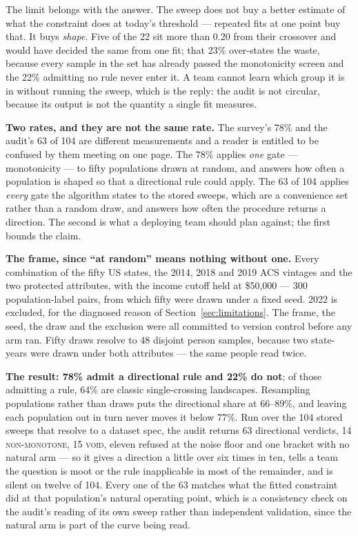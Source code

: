 \documentclass[conference]{IEEEtran}
\begin{document}
The limit belongs with the answer. The sweep does not buy a better estimate of what the
constraint does at today's threshold --- repeated fits at one point buy that. It buys
\emph{shape}. Five of the 22 sit more than 0.20 from their crossover and would have decided
the same from one fit; that 23\% over-states the waste, because every sample in the set has
already passed the monotonicity screen and the 22\% admitting no rule never enter it. A team
cannot learn which group it is in without running the sweep, which is the reply: the audit is
not circular, because its output is not the quantity a single fit measures.

\textbf{Two rates, and they are not the same rate.} The survey's 78\% and the audit's 63 of 104
are different measurements and a reader is entitled to be confused by them meeting on one
page. The 78\% applies \emph{one} gate --- monotonicity --- to fifty populations drawn at
random, and answers how often a population is shaped so that a directional rule could apply.
The 63 of 104 applies \emph{every} gate the algorithm states to the stored sweeps, which are a
convenience set rather than a random draw, and answers how often the procedure returns a
direction. The second is what a deploying team should plan against; the first bounds the
claim.

\textbf{The frame, since ``at random'' means nothing without one.} Every combination of the
fifty US states, the 2014, 2018 and 2019 ACS vintages and the two protected attributes, with
the income cutoff held at \$50{,}000 --- 300 population-label pairs, from which fifty were
drawn under a fixed seed. 2022 is excluded, for the diagnosed reason of
Section~\ref{sec:limitations}. The frame, the seed, the draw and the exclusion were all
committed to version control before any arm ran. Fifty draws resolve to 48 disjoint person
samples, because two state-years were drawn under both attributes --- the same people read
twice.

\textbf{The result: 78\% admit a directional rule and 22\% do not}; of those admitting a rule, 64\% are classic
single-crossing landscapes. Resampling populations rather than draws puts the directional
share at 66--89\%, and leaving each population out in turn never moves it below 77\%. Run over the 104 stored sweeps that resolve to a dataset spec, the audit returns 63 directional verdicts, 14 \textsc{non-monotone}, 15 \textsc{void}, eleven refused at the noise floor and one bracket with no natural arm --- so it gives a direction a little over six times in ten, tells a team the question is moot or the rule inapplicable in most of the remainder, and is silent on twelve of 104. Every one of the 63 matches what the fitted constraint did at that population's
natural operating point, which is a consistency check on the audit's reading of its own sweep
rather than independent validation, since the natural arm is part of the curve being read.
\end{document}
